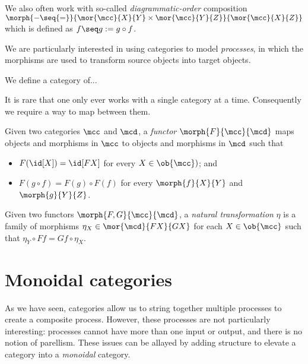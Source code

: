 \begin{notation}
    We also often work with so-called \emph{diagrammatic-order} composition \(
        \morph{
            {-} \seq {=}
        }{
            \mor{\mcc}{X}{Y} \times \mor{\mcc}{Y}{Z}
        }{
            \mor{\mcc}{X}{Z}
        }
    \) which is defined as \(f \seq g := g \circ f\).
\end{notation}

We are particularly interested in using categories to model \emph{processes},
in which the morphisms are used to transform source objects into target objects.

\begin{example}
    We define a category of...
\end{example}

It is rare that one only ever works with a single category at a time.
Consequently we require a way to map between them.

\begin{definition}[Functor]
    Given two categories \(\mcc\) and \(\mcd\), a \emph{functor} \(
        \morph{F}{\mcc}{\mcd}
    \) maps objects and morphisms in \(\mcc\) to objects and morphisms in
    \(\mcd\) such that
    \begin{itemize}
        \item \(F(\id[X]) = \id[FX]\) for every \(X \in \ob{\mcc})\); and
        \item \(F(g \circ f) = F(g) \circ F(f)\) for every \(\morph{f}{X}{Y}\)
        and \(\morph{g}{Y}{Z}\).
    \end{itemize}
\end{definition}

\begin{definition}
    Given two functors \(\morph{F, G}{\mcc}{\mcd}\), a
    \emph{natural transformation} \(\eta\) is a family of morphisms \(
        \eta_X \in \mor{\mcd}{FX}{GX}
    \) for each \(X \in \ob{\mcc}\) such that \(
        \eta_Y \circ Ff = Gf \circ \eta_X
    \).
\end{definition}

\section{Monoidal categories}

As we have seen, categories allow us to string together multiple processes to
create a composite process.
However, these processes are not particularly interesting: processes cannot have
more than one input or output, and there is no notion of parellism.
These issues can be allayed by adding structure to elevate a category into a
\emph{monoidal} category.

